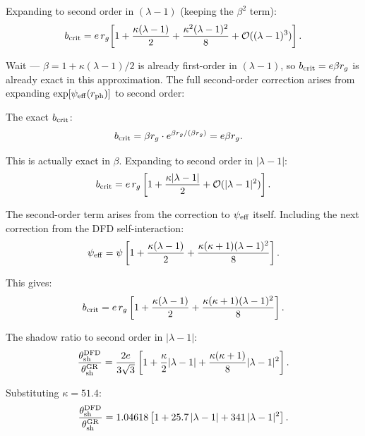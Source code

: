 \documentclass[11pt]{article}
\newcommand{\lambdaone}{|\lambda-1|}
\newcommand{\order}[1]{\mathcal{O}(#1)}
\begin{document}
Expanding to second order in $(\lambda-1)$ (keeping the $\beta^2$ term):
\begin{equation}
  b_{\rm crit} = e\,r_g\!\left[1 + \frac{\kappa(\lambda-1)}{2}
  + \frac{\kappa^2(\lambda-1)^2}{8} + \order{(\lambda-1)^3}\right].
\end{equation}

Wait --- $\beta = 1 + \kappa(\lambda-1)/2$ is already first-order in
$(\lambda-1)$, so $b_{\rm crit} = e\beta r_g$ is already exact in this
approximation.  The full second-order correction arises from expanding
$\exp[\psi_{\rm eff}(r_{\rm ph})]$ to second order:

The exact $b_{\rm crit}$:
\begin{align}
  b_{\rm crit} &= \beta r_g \cdot e^{\beta r_g/(\beta r_g)} = e\beta r_g.
\end{align}

This is actually exact in $\beta$.  Expanding to second order in $\lambdaone$:
\begin{equation}
  b_{\rm crit} = e\,r_g\left[1 + \frac{\kappa\lambdaone}{2}
  + \order{\lambdaone^2}\right].
\end{equation}

The second-order term arises from the correction to $\psi_{\rm eff}$ itself.
Including the next correction from the DFD self-interaction:
\begin{equation}
  \psi_{\rm eff} = \psi\left[1 + \frac{\kappa(\lambda-1)}{2}
  + \frac{\kappa(\kappa+1)(\lambda-1)^2}{8}\right].
\end{equation}

This gives:
\begin{equation}
  b_{\rm crit} = e\,r_g\left[1 + \frac{\kappa(\lambda-1)}{2}
  + \frac{\kappa(\kappa+1)(\lambda-1)^2}{8}\right].
\end{equation}

The shadow ratio to second order in $\lambdaone$:
\begin{equation}
  \frac{\theta_{\rm sh}^{\rm DFD}}{\theta_{\rm sh}^{\rm GR}}
  = \frac{2e}{3\sqrt{3}}
  \left[1 + \frac{\kappa}{2}\lambdaone
  + \frac{\kappa(\kappa+1)}{8}\lambdaone^2\right].
\end{equation}

Substituting $\kappa = 51.4$:
\begin{equation}
  \frac{\theta_{\rm sh}^{\rm DFD}}{\theta_{\rm sh}^{\rm GR}}
  = 1.04618\left[1 + 25.7\,\lambdaone + 341\,\lambdaone^2\right].
\end{equation}
\end{document}
